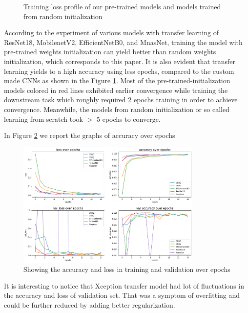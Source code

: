 \documentclass[conference]{IEEEtran}
\begin{document}
\begin{figure}[h]
    \caption{Training loss profile of our pre-trained models and models trained from random initialization}
    \label{fig:training_loss}
\end{figure}

According to the experiment of various models with transfer learning of ResNet18, MobilenetV2, EfficientNetB0, and MnasNet, training the model with pre-trained weights initialization can yield better than random weights initialization, which corresponds to this paper\cite{kornblith2019better}. It is also evident that transfer learning yields to a high accuracy using less epochs, compared to the custom made CNNs as shown in the Figure \ref{fig:training_loss}. Most of the pre-trained-initialization models colored in red lines exhibited earlier convergence while training the downstream task which roughly required 2 epochs training in order to achieve convergence. Meanwhile, the models from random initialization or so called learning from scratch took $>$ 5 epochs to converge.


In Figure \ref{bench} we report the graphs of accuracy over epochs

\begin{figure}[h]
\centering
\includegraphics[width=3.6in]{performance_5.png}
\caption{Showing the accuracy and loss in training and validation over epochs}
\label{bench}
\end{figure}

It is interesting to notice that Xception transfer model had lot of fluctuations in the accuracy and loss of validation set. That was a symptom of overfitting and could be further reduced by adding better regularization. 
\end{document}
